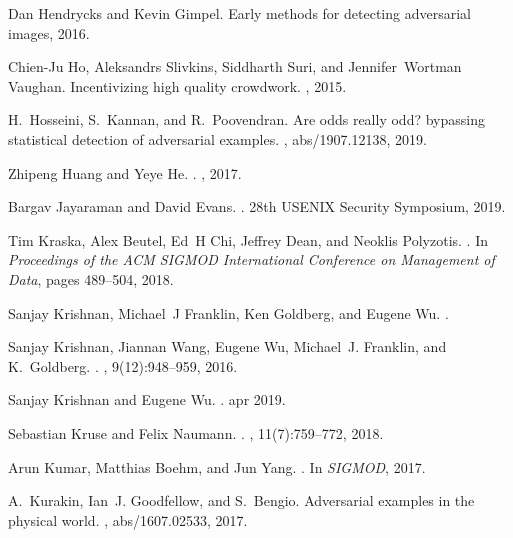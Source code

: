 \documentclass[11pt]{article}
\begin{document}
\begin{thebibliography}{10}
Dan Hendrycks and Kevin Gimpel.
\newblock Early methods for detecting adversarial images, 2016.

Chien-Ju Ho, Aleksandrs Slivkins, Siddharth Suri, and Jennifer~Wortman Vaughan.
\newblock Incentivizing high quality crowdwork.
, 2015.

H.~Hosseini, S.~Kannan, and R.~Poovendran.
\newblock Are odds really odd? bypassing statistical detection of adversarial
  examples.
, abs/1907.12138, 2019.

Zhipeng Huang and Yeye He.
.
, 2017.

Bargav Jayaraman and David Evans.
.
\newblock 28th USENIX Security Symposium, 2019.

Tim Kraska, Alex Beutel, Ed~H Chi, Jeffrey Dean, and Neoklis Polyzotis.
.
\newblock In {\em Proceedings of the ACM SIGMOD International Conference on
  Management of Data}, pages 489--504, 2018.

Sanjay Krishnan, Michael~J Franklin, Ken Goldberg, and Eugene Wu.
.

Sanjay Krishnan, Jiannan Wang, Eugene Wu, Michael~J. Franklin, and K.~Goldberg.
.
, 9(12):948--959, 2016.

Sanjay Krishnan and Eugene Wu.
.
\newblock apr 2019.

Sebastian Kruse and Felix Naumann.
.
, 11(7):759--772, 2018.

Arun Kumar, Matthias Boehm, and Jun Yang.
.
\newblock In {\em SIGMOD}, 2017.

A.~Kurakin, Ian~J. Goodfellow, and S.~Bengio.
\newblock Adversarial examples in the physical world.
, abs/1607.02533, 2017.


\end{thebibliography}
\end{document}
